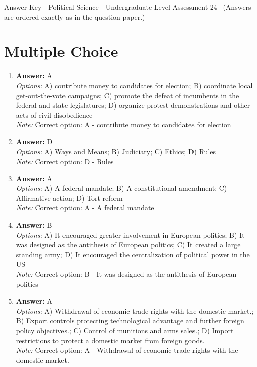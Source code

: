 \documentclass[12pt]{article}
\begin{document}
\begin{center}
Answer Key - Political Science - Undergraduate Level Assessment 24 \
\small (Answers are ordered exactly as in the question paper.)
\end{center}

\section*{Multiple Choice}
\begin{enumerate}[label=\arabic*.]
\item \textbf{Answer:} A
\\ \textit{Options:} A) contribute money to candidates for election; B) coordinate local get-out-the-vote campaigns; C) promote the defeat of incumbents in the federal and state legislatures; D) organize protest demonstrations and other acts of civil disobedience
\\ \textit{Note:} Correct option: A - contribute money to candidates for election
\item \textbf{Answer:} D
\\ \textit{Options:} A) Ways and Means; B) Judiciary; C) Ethics; D) Rules
\\ \textit{Note:} Correct option: D - Rules
\item \textbf{Answer:} A
\\ \textit{Options:} A) A federal mandate; B) A constitutional amendment; C) Affirmative action; D) Tort reform
\\ \textit{Note:} Correct option: A - A federal mandate
\item \textbf{Answer:} B
\\ \textit{Options:} A) It encouraged greater involvement in European politics; B) It was designed as the antithesis of European politics; C) It created a large standing army; D) It encouraged the centralization of political power in the US
\\ \textit{Note:} Correct option: B - It was designed as the antithesis of European politics
\item \textbf{Answer:} A
\\ \textit{Options:} A) Withdrawal of economic trade rights with the domestic market.; B) Export controls protecting technological advantage and further foreign policy objectives.; C) Control of munitions and arms sales.; D) Import restrictions to protect a domestic market from foreign goods.
\\ \textit{Note:} Correct option: A - Withdrawal of economic trade rights with the domestic market.
\end{enumerate}
\end{document}

